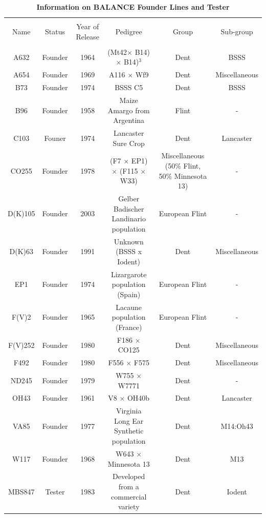 \documentclass[article,9pt,twocolumn,twoside]{rilabRxiv}
\begin{document}
\begin{table}
\centering
\caption{\bf Information on BALANCE Founder Lines and Tester}
\label{tab:founder_suptable}
\begin{adjustbox}{max width=0.98\textwidth,center}
\begin{tabular}{c c c c c c}
\hline \hline \\
Name & Status & Year of Release & Pedigree & Group & Sub-group \\
\hline \\
A632 & Founder & 1964 & (Mt42$\times$ B14) $\times$ B14)$^3$ & Dent & BSSS \\
A654 & Founder & 1969 & A116 $\times$ Wf9 & Dent & Miscellaneous \\
B73 & Founder & 1974 & BSSS C5 & Dent & BSSS \\
B96 & Founder & 1958 & Maize Amargo from Argentina & Flint & - \\
C103 & Founer & 1974 & Lancaster Sure Crop & Dent & Lancaster \\
CO255 & Founder & 1978 & (F7 $\times$ EP1) $\times$ (F115 $\times$ W33) & Miscellaneous (50\% Flint, 50\% Minnesota 13) & - \\
D(K)105 & Founder & 2003 & Gelber Badischer Landinario population & European Flint & - \\
D(K)63 & Founder & 1991 & Unknown (BSSS x Iodent) & Dent & Miscellaneous \\
EP1 & Founder & 1974 & Lizargarote population (Spain) & European Flint & - \\
F(V)2 & Founder & 1965 & Lacaune population (France) & European Flint & - \\
F(V)252 & Founder & 1980 & F186 $\times$ CO125 & Dent & Miscellaneous \\
F492 & Founder & 1980 & F556 $\times$ F575 & Dent & Miscellaneous \\
ND245 & Founder & 1979 & W755 $\times$ W7771 & Dent & - \\
OH43 & Founder & 1961 & V8 $\times$ OH40b & Dent & Lancaster \\
VA85 & Founder & 1977 & Virginia Long Ear Synthetic population & Dent & M14:Oh43 \\
W117 & Founder & 1968 & W643 $\times$ Minnesota 13 & Dent & M13 \\
MBS847 & Tester & 1983 & Developed from a commercial variety & Dent & Iodent \\
\hline
\end{tabular}
\end{adjustbox}
\end{table}
\endsupplement
\end{document}
